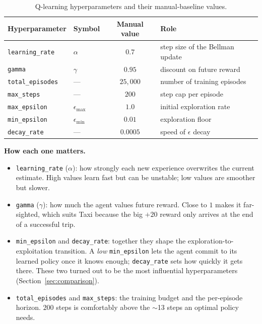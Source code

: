 \documentclass[11pt]{article}
\begin{document}
\begin{table}[h]
\centering
\begin{tabular}{@{}llcl@{}}
\toprule
\textbf{Hyperparameter} & \textbf{Symbol} & \textbf{Manual value} & \textbf{Role} \\
\midrule
\texttt{learning\_rate} & $\alpha$            & $0.7$    & step size of the Bellman update \\
\texttt{gamma}          & $\gamma$            & $0.95$   & discount on future reward \\
\texttt{total\_episodes}& ---                 & $25{,}000$ & number of training episodes \\
\texttt{max\_steps}     & ---                 & $200$    & step cap per episode \\
\texttt{max\_epsilon}   & $\epsilon_{\max}$   & $1.0$    & initial exploration rate \\
\texttt{min\_epsilon}   & $\epsilon_{\min}$   & $0.01$   & exploration floor \\
\texttt{decay\_rate}    & ---                 & $0.0005$ & speed of $\epsilon$ decay \\
\bottomrule
\end{tabular}
\caption{Q-learning hyperparameters and their manual-baseline values.}
\label{tab:hyperparams}
\end{table}

\noindent\textbf{How each one matters.}
\begin{itemize}[noitemsep]
  \item \texttt{learning\_rate} ($\alpha$): how strongly each new experience overwrites the
        current estimate. High values learn fast but can be unstable; low values are smoother
        but slower.
  \item \texttt{gamma} ($\gamma$): how much the agent values future reward. Close to $1$ makes
        it far-sighted, which suits Taxi because the big $+20$ reward only arrives at the end
        of a successful trip.
  \item \texttt{min\_epsilon} and \texttt{decay\_rate}: together they shape the
        exploration-to-exploitation transition. A \emph{low} \texttt{min\_epsilon} lets the
        agent commit to its learned policy once it knows enough; \texttt{decay\_rate} sets how
        quickly it gets there. These two turned out to be the most influential hyperparameters
        (Section~\ref{sec:comparison}).
  \item \texttt{total\_episodes} and \texttt{max\_steps}: the training budget and the per-episode
        horizon. $200$ steps is comfortably above the $\sim$13 steps an optimal policy needs.
\end{itemize}
\end{document}
